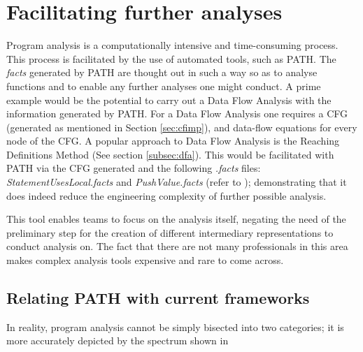     \section{Facilitating further analyses}
    \label{sec:ffa}
    \par Program analysis is a computationally intensive and time-consuming process. This process is facilitated by the use of automated tools, such as \acs{PATH}. The \textit{facts} generated 
    by \acs{PATH} are thought out in such a way so as to analyse functions and to enable any further analyses one might conduct. A prime example would be the potential to carry out a Data Flow Analysis with the 
    information generated by \acs{PATH}. For a Data Flow Analysis one requires a \acs{CFG} (generated as mentioned in Section \ref{sec:cfimp}), and data-flow equations for every node of the \acs{CFG}.
    A popular approach to Data Flow Analysis is the Reaching Definitions Method (See section \ref{subsec:dfa}). This would be facilitated with \acs{PATH} via the \acs{CFG} generated and the following \textit{.facts} files:
    \textit{StatementUsesLocal.facts} and \textit{PushValue.facts} (refer to ); demonstrating that it does indeed reduce the engineering complexity of further possible analysis. 
    \par This tool enables teams to focus on the analysis itself, negating the need of the preliminary step for the creation of different intermediary representations to conduct analysis on. The fact that 
    there are not many professionals in this area makes complex analysis tools expensive and rare to come across.
        \subsection{Relating \acs{PATH} with current frameworks}
            \par In reality, program analysis cannot be simply bisected into two categories; it is more accurately depicted by the spectrum shown in 

